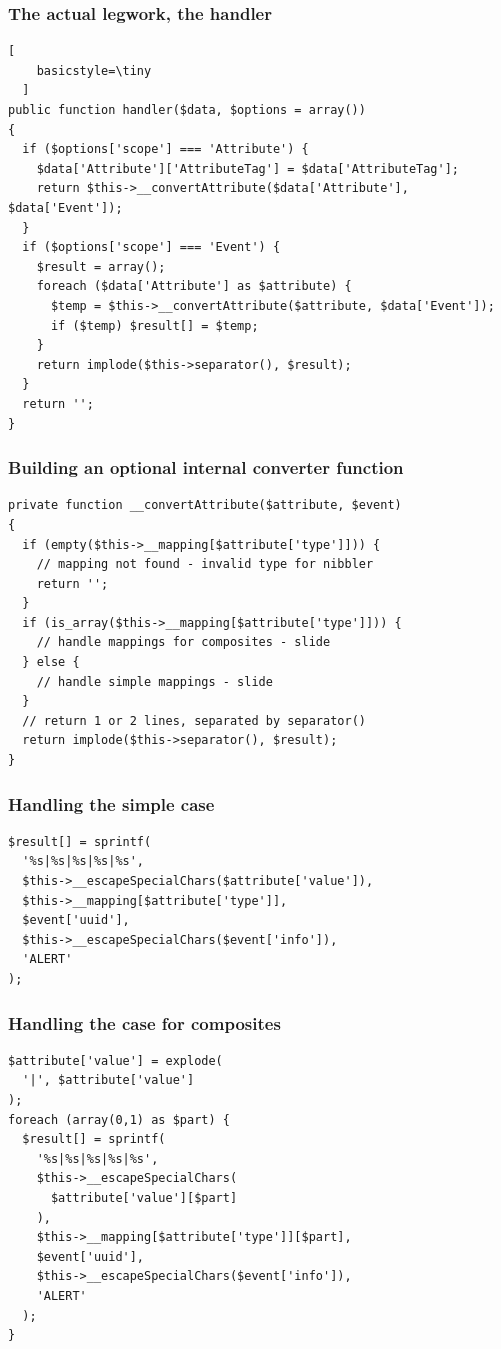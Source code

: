 \begin{frame}[fragile]
  \frametitle{The actual legwork, the handler}
  \begin{lstlisting}[
    basicstyle=\tiny
  ]
public function handler($data, $options = array())
{
  if ($options['scope'] === 'Attribute') {
    $data['Attribute']['AttributeTag'] = $data['AttributeTag'];
    return $this->__convertAttribute($data['Attribute'], $data['Event']);
  }
  if ($options['scope'] === 'Event') {
    $result = array();
    foreach ($data['Attribute'] as $attribute) {
      $temp = $this->__convertAttribute($attribute, $data['Event']);
      if ($temp) $result[] = $temp;
    }
    return implode($this->separator(), $result);
  }
  return '';
}
  \end{lstlisting}
\end{frame}

\begin{frame}[fragile]
  \frametitle{Building an optional internal converter function}
  \begin{lstlisting}
private function __convertAttribute($attribute, $event)
{
  if (empty($this->__mapping[$attribute['type']])) {
    // mapping not found - invalid type for nibbler
    return '';
  }
  if (is_array($this->__mapping[$attribute['type']])) {
    // handle mappings for composites - slide
  } else {
    // handle simple mappings - slide 
  }
  // return 1 or 2 lines, separated by separator()
  return implode($this->separator(), $result);
}
  \end{lstlisting}
\end{frame}

\begin{frame}[fragile]
  \frametitle{Handling the simple case}
  \begin{lstlisting}
$result[] = sprintf(
  '%s|%s|%s|%s|%s',
  $this->__escapeSpecialChars($attribute['value']),
  $this->__mapping[$attribute['type']],
  $event['uuid'],
  $this->__escapeSpecialChars($event['info']),
  'ALERT'
);
  \end{lstlisting}
\end{frame}

\begin{frame}[fragile]
  \frametitle{Handling the case for composites}
  \begin{lstlisting}
$attribute['value'] = explode(
  '|', $attribute['value']
);
foreach (array(0,1) as $part) {
  $result[] = sprintf(
    '%s|%s|%s|%s|%s',
    $this->__escapeSpecialChars(
      $attribute['value'][$part]
    ),
    $this->__mapping[$attribute['type']][$part],
    $event['uuid'],
    $this->__escapeSpecialChars($event['info']),
    'ALERT'
  );
}
  \end{lstlisting}
\end{frame}


